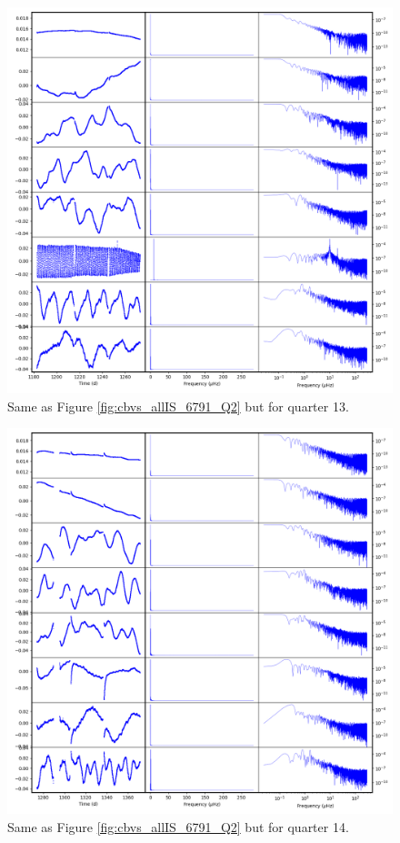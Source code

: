 \begin{figure}
    \centering
    \includegraphics[width=\linewidth]{Chapter_Appended/AppB/cbv_6791_q13.png}
    \caption{Same as Figure \ref{fig:cbvs_allIS_6791_Q2} but for quarter 13.}
    \label{fig:cbvs_allIS_6791_Q13}
\end{figure}


\begin{figure}
    \centering
    \includegraphics[width=\linewidth]{Chapter_Appended/AppB/cbv_6791_q14.png}
    \caption{Same as Figure \ref{fig:cbvs_allIS_6791_Q2} but for quarter 14.}
    \label{fig:cbvs_allIS_6791_Q14}
\end{figure}


